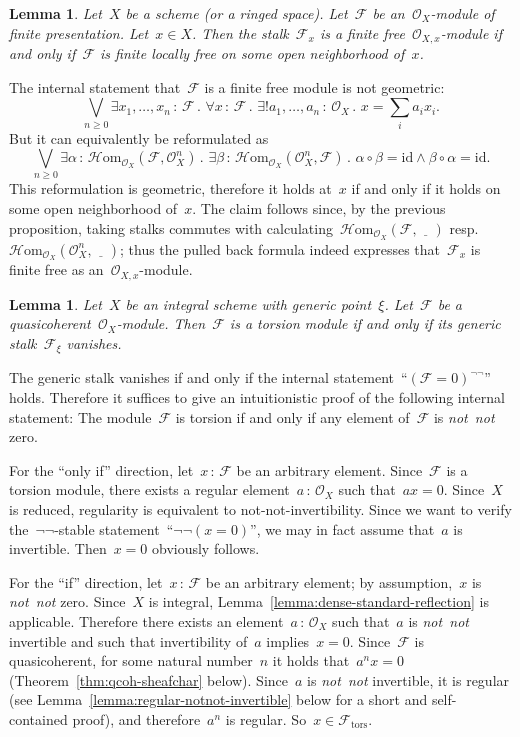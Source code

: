 \documentclass[10pt,reqno,a4paper]{amsbook}
\makeatletter
\theoremstyle{definition}
\theoremstyle{plain}
\newtheorem{lemma}[defn]{Lemma}
\theoremstyle{remark}
\newcommand{\F}{\mathcal{F}}
\renewcommand{\O}{\mathcal{O}}
\newcommand{\HOM}{\mathcal{H}\mathrm{om}}
\newcommand{\id}{\mathrm{id}}
\newcommand{\placeholder}{\underline{\quad}}
\newcommand{\tors}{\mathrm{tors}}
\newcommand{\?}{\,{:}\,}
\renewcommand{\_}{\mathpunct{.}\,}
\newcommand{\resp}{resp.\@\xspace}
\newcommand{\notnot}{\emph{not~not}\xspace}
\renewenvironment{proof}[1][\proofname]{\par
  \pushQED{\qed}%
  \normalfont \topsep6\p@\@plus6\p@\relax
  \trivlist
  \item[\hskip\labelsep
        \itshape
    #1\@addpunct{.}]\ignorespaces
}{%
  \popQED\endtrivlist\@endpefalse
}
\makeatother
\begin{document}
\begin{lemma}Let~$X$ be a scheme (or a ringed space). Let~$\F$ be an~$\O_X$-module of finite
presentation. Let~$x \in X$. Then the stalk~$\F_x$ is a finite
free~$\O_{X,x}$-module if and only if~$\F$ is finite locally free on some open
neighborhood of~$x$.\end{lemma}
\begin{proof}The internal statement that~$\F$ is a finite free module is not geometric:
\[ \bigvee_{n \geq 0}
  \exists x_1,\ldots,x_n\?\F\_
  \forall x\?\F\_
  \exists! a_1,\ldots,a_n\?\O_X\_
  x = \textstyle\sum_i a_i x_i. \]
But it can equivalently be reformulated as
\[ \bigvee_{n \geq 0}
  \exists \alpha\?\HOM_{\O_X}(\F,\O_X^n)\_
  \exists \beta\?\HOM_{\O_X}(\O_X^n,\F)\_
  \alpha \circ \beta = \id \wedge \beta \circ \alpha = \id. \]
This reformulation is geometric, therefore it holds at~$x$ if and only if it
holds on some open neighborhood of~$x$. The claim follows since, by the
previous proposition, taking stalks commutes with
calculating~$\HOM_{\O_X}(\F,\placeholder)$ \resp~$\HOM_{\O_X}(\O_X^n,\placeholder)$;
thus the pulled back formula indeed expresses that~$\F_x$ is finite free as
an~$\O_{X,x}$-module.
\end{proof}

\begin{lemma}\label{lemma:torsion-module-generic-stalk}
Let~$X$ be an integral scheme with generic point~$\xi$. Let~$\F$
be a quasicoherent~$\O_X$-module. Then~$\F$ is a torsion module if and only if
its generic stalk~$\F_\xi$ vanishes.
\end{lemma}
\begin{proof}The generic stalk vanishes if and only if the internal
statement~``$(\F = 0)^{\neg\neg}$'' holds. Therefore it suffices to give an
intuitionistic proof of the following internal statement: The module~$\F$ is
torsion if and only if any element of~$\F$ is \notnot zero.

For the ``only if'' direction, let~$x\?\F$ be an arbitrary element. Since~$\F$
is a torsion module, there exists a regular element~$a\?\O_X$ such that~$ax =
0$. Since~$X$ is reduced, regularity is equivalent to not-not-invertibility.
Since we want to verify the~$\neg\neg$-stable statement~``$\neg\neg(x = 0)$'', we
may in fact assume that~$a$ is invertible. Then~$x = 0$ obviously follows.

For the ``if'' direction, let~$x\?\F$ be an arbitrary element; by assumption,~$x$
is \notnot zero. Since~$X$ is integral,
Lemma~\ref{lemma:dense-standard-reflection} is applicable. Therefore there
exists an element~$a\?\O_X$ such that~$a$ is \notnot invertible and such that
invertibility of~$a$ implies~$x = 0$. Since~$\F$ is quasicoherent, for some
natural number~$n$ it holds that~$a^n x = 0$ (Theorem~\ref{thm:qcoh-sheafchar}
below). Since~$a$ is \notnot invertible,
it is regular (see Lemma~\ref{lemma:regular-notnot-invertible} below for a short
and self-contained proof), and therefore~$a^n$ is regular. So~$x \in \F_\tors$.
\end{proof}
\end{document}
